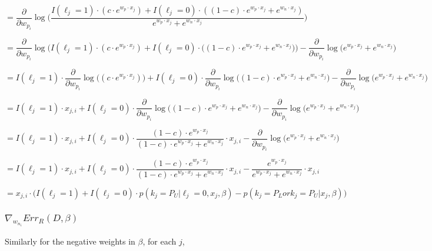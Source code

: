 \documentclass[]{article}
\begin{document}
$$
 = \frac{\partial}{\partial w_{p_i}}
		\log{\Bigg(
		    \frac{
			I(\ell_j=1) \cdot \left( c \cdot e^{w_p \cdot x_j} \right) + 
			I(\ell_j=0) \cdot \left( (1 - c) \cdot e^{w_p \cdot x_j}  + e^{w_n \cdot x_j} \right)
		     }{e^{w_p \cdot x_j} + e^{w_n \cdot x_j}}
		\Bigg)}
$$

$$
 = \frac{\partial}{\partial w_{p_i}}
		\log{\bigg(
			I(\ell_j=1) \cdot \left( c \cdot e^{w_p \cdot x_j} \right) + 
			I(\ell_j=0) \cdot \Big( (1 - c) \cdot e^{w_p \cdot x_j}  + e^{w_n \cdot x_j} \Big)
		\bigg)}
		- \frac{\partial}{\partial w_{p_i}}
		 \log{\bigg(
			e^{w_p \cdot x_j} + e^{w_n \cdot x_j}
		\bigg)}
$$


$$
 = I(\ell_j=1) \cdot \frac{\partial}{\partial w_{p_i}}
		\log{\Big(
			\left( c \cdot e^{w_p \cdot x_j} \right) 
		\Big)} +
    I(\ell_j=0) \cdot \frac{\partial}{\partial w_{p_i}}
		\log{ \Big( (1 - c) \cdot e^{w_p \cdot x_j}  + e^{w_n \cdot x_j} \Big) }
		- \frac{\partial}{\partial w_{p_i}}
		 \log{\bigg(
			e^{w_p \cdot x_j} + e^{w_n \cdot x_j}
		\bigg)}
$$

$$
 = I(\ell_j=1) \cdot x_{j,i} + 
    I(\ell_j=0) \cdot \frac{\partial}{\partial w_{p_i}}
		\log{ \Big( (1 - c) \cdot e^{w_p \cdot x_j}  + e^{w_n \cdot x_j} \Big) }
		- \frac{\partial}{\partial w_{p_i}}
		 \log{\bigg(
			e^{w_p \cdot x_j} + e^{w_n \cdot x_j}
		\bigg)}
$$


$$
 = I(\ell_j=1) \cdot x_{j,i} + 
    I(\ell_j=0) \cdot 
 		\frac{
			(1 - c) \cdot e^{w_p \cdot x_j}
		}{
			(1 - c) \cdot e^{w_p \cdot x_j}  + e^{w_n \cdot x_j}
		} \cdot x_{j,i}
		- \frac{\partial}{\partial w_{p_i}}
		 \log{\Big(
			e^{w_p \cdot x_j} + e^{w_n \cdot x_j}
		\Big)}
$$


$$
 = I(\ell_j=1) \cdot x_{j,i} + 
    I(\ell_j=0) \cdot 
 		\frac{
			(1 - c) \cdot e^{w_p \cdot x_j}
		}{
			(1 - c) \cdot e^{w_p \cdot x_j}  + e^{w_n \cdot x_j}
		} \cdot x_{j,i}
		- 
 		\frac{
			e^{w_p \cdot x_j}
		}{
			e^{w_p \cdot x_j}  + e^{w_n \cdot x_j}
		} \cdot x_{j,i}
$$

$$
 = x_{j,i} \cdot
    \Big(	I(\ell_j=1) + 
		I(\ell_j=0) \cdot p(k_j=P_U | \ell_j=0, x_j, \beta) - 
		p(k_j=P_L or k_j=P_U | x_j, \beta)
    \Big)
$$


\subsubsection{$ \nabla_{w_{n_i}}{Err_R (D, \beta)}$}

Similarly for the negative weights in $\beta$, for each $j$,
\end{document}
